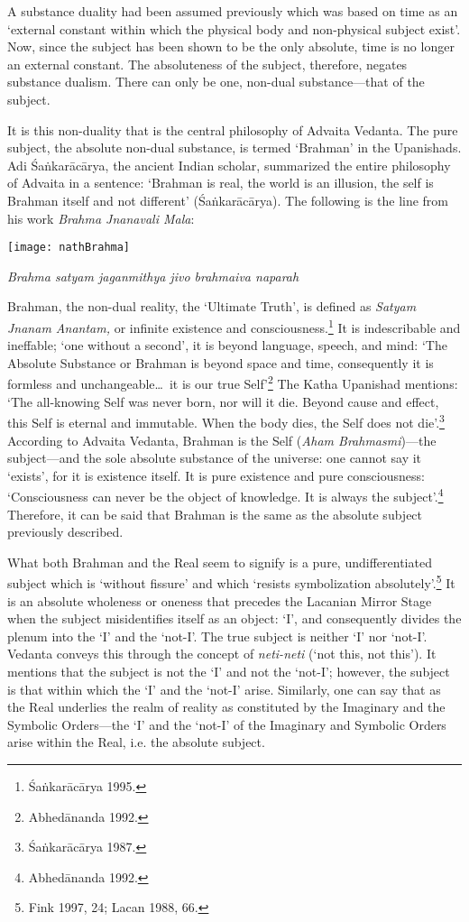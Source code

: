 A substance duality had been assumed previously which was based on time
as an `external constant within which the physical body and non-physical
subject exist'. Now, since the subject has been shown to be the only
absolute, time is no longer an external constant. The absoluteness of
the subject, therefore, negates substance dualism. There can only be
one, non-dual substance---that of the subject.

It is this non-duality that is the central philosophy of Advaita
Vedanta. The pure subject, the absolute non-dual substance, is termed
`Brahman' in the Upanishads. Adi \'Sa\.nkar\=ac\=arya, the ancient Indian
scholar, summarized the entire philosophy of Advaita in a sentence:
`Brahman is real, the world is an illusion, the self is Brahman itself
and not different' (\'Sa\.nkar\=ac\=arya). The following is the line from his
work \emph{Brahma Jnanavali Mala}:
\begin{center}
\texttt{[image: nathBrahma]}

\emph{Brahma satyam jaganmithya jivo brahmaiva naparah}
\end{center}
Brahman, the non-dual reality, the `Ultimate Truth', is defined as
\emph{Satyam Jnanam Anantam,} or infinite existence and consciousness.\footnote{\'Sa\.nkar\=ac\=arya 1995.} It is indescribable and ineffable; `one without a
second', it is beyond language, speech, and mind: `The Absolute
Substance or Brahman is beyond space and time, consequently it is
formless and unchangeable\ldots\ it is our true Self'\footnote{Abhed\=ananda
1992.} The Katha Upanishad mentions: `The all-knowing Self was never
born, nor will it die. Beyond cause and effect, this Self is eternal and
immutable. When the body dies, the Self does not die'.\footnote{\'Sa\.nkar\=ac\=arya
1987.} According to Advaita Vedanta, Brahman is the Self (\emph{Aham
Brahmasmi})---the subject---and the sole absolute substance of the
universe: one cannot say it `exists', for it is existence itself. It is
pure existence and pure consciousness: `Consciousness can never be the
object of knowledge. It is always the subject'.\footnote{Abhed\=ananda 1992.}
Therefore, it can be said that Brahman is the same as the absolute
subject previously described.

What both Brahman and the Real seem to signify is a pure,
undifferentiated subject which is `without fissure' and which `resists
symbolization absolutely'.\footnote{Fink 1997, 24; Lacan 1988, 66.} It is an
absolute wholeness or oneness that precedes the Lacanian Mirror Stage
when the subject misidentifies itself as an object: `I', and
consequently divides the plenum into the `I' and the `not-I'. The true
subject is neither `I' nor `not-I'. Vedanta conveys this through the
concept of \emph{neti-neti} (`not this, not this'). It mentions that the
subject is not the `I' and not the `not-I'; however, the subject is that
within which the `I' and the `not-I' arise. Similarly, one can say that
as the Real underlies the realm of reality as constituted by the
Imaginary and the Symbolic Orders---the `I' and the `not-I' of the
Imaginary and Symbolic Orders arise within the Real, i.e. the absolute
subject.

